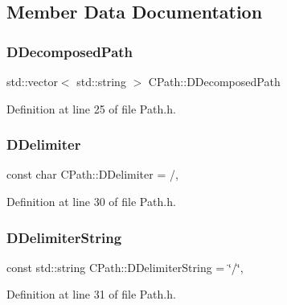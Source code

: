 \subsection{Member Data Documentation}
\hypertarget{classCPath_a03ed25209a01e633c107a0c877fc61f8}{}\label{classCPath_a03ed25209a01e633c107a0c877fc61f8} 
\subsubsection{\texorpdfstring{D\+Decomposed\+Path}{DDecomposedPath}}
{\footnotesize\ttfamily std\+::vector$<$ std\+::string $>$ C\+Path\+::\+D\+Decomposed\+Path\hspace{0.3cm}{\ttfamily [protected]}}



Definition at line 25 of file Path.\+h.

\hypertarget{classCPath_a4af2d74fc7695c4de8900dcc426530b5}{}\label{classCPath_a4af2d74fc7695c4de8900dcc426530b5} 
\subsubsection{\texorpdfstring{D\+Delimiter}{DDelimiter}}
{\footnotesize\ttfamily const char C\+Path\+::\+D\+Delimiter = \textquotesingle{}/\textquotesingle{}\hspace{0.3cm}{\ttfamily [static]}, {\ttfamily [protected]}}



Definition at line 30 of file Path.\+h.

\hypertarget{classCPath_a88b8652d01ff3359a48dd75126cc5776}{}\label{classCPath_a88b8652d01ff3359a48dd75126cc5776} 
\subsubsection{\texorpdfstring{D\+Delimiter\+String}{DDelimiterString}}
{\footnotesize\ttfamily const std\+::string C\+Path\+::\+D\+Delimiter\+String = \char`\"{}/\char`\"{}\hspace{0.3cm}{\ttfamily [static]}, {\ttfamily [protected]}}



Definition at line 31 of file Path.\+h.

